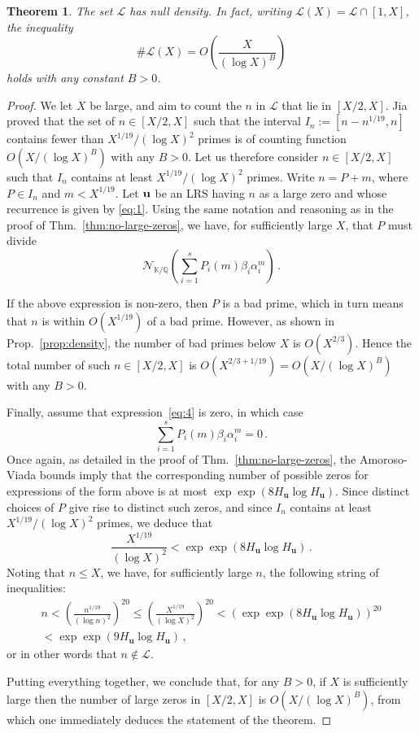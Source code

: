 \documentclass[preprint,12pt]{elsarticle}
\newtheorem{theorem}{Theorem}[section]
\begin{document}
\begin{theorem}
  \label{thm:density-0}
  The set ${\mathcal L}$ has null density.
  In fact, writing ${\mathcal L}(X)={\mathcal L} \mathop{\cap} [1,X]$, the inequality 
\[
\#{\mathcal L}(X)=O\left(\frac{X}{(\log X)^B}\right) 
\]
holds with any constant $B>0$. 
\end{theorem}   
\begin{proof}
We let $X$ be large, and aim to count the $n$ in $\mathcal{L}$ that
lie in $[X/2,X]$. Jia~\cite{Jia96} proved that the set of $n\in
[X/2,X]$ such that the interval $I_n :=[n-n^{1/19}, n]$
contains fewer than $X^{1/19}/(\log X)^2$ primes is of counting
function  $O(X/(\log X)^B)$ with any $B>0$. Let us therefore
consider $n \in [X/2,X]$ such that
$I_n$ contains at least $X^{1/19}/(\log X)^2$ primes.
Write $n=P+m$, where $P\in I_n$ and $m<X^{1/19}$. Let ${\bf u}$
be an LRS having $n$ as a large zero and whose recurrence is given by 
\eqref{eq:1}. Using the same notation and reasoning as in the proof of
Thm.~\ref{thm:no-large-zeros},
we have, for sufficiently large $X$, that $P$ must divide
\begin{equation}
\label{eq:4}
{\mathcal N}_{{\mathbb K}/{\mathbb Q}}\left(\sum_{i=1}^s
  P_i(m)\beta_i\alpha_i^m\right) \, .
\end{equation}

If the above expression is non-zero, then $P$ is a bad prime, which in
turn means that $n$ is within $O(X^{1/19})$ of a bad prime. However, as
shown in Prop.~\ref{prop:density}, the number of bad primes below $X$
is $O(X^{2/3})$. Hence the total number of such $n\in [X/2,X]$ is 
$O(X^{2/3+1/19})=O(X/(\log X)^B)$ with any $B > 0$.

Finally, assume that expression~\eqref{eq:4} is zero, in which
case
\[
\sum_{i=1}^s P_i(m)\beta_i\alpha_i^m=0 \, .
\]
Once again, as detailed in the proof of Thm.~\ref{thm:no-large-zeros},
the Amoroso-Viada bounds imply that the corresponding number of
possible zeros for expressions of the form above is at most
$\exp \exp (8 H_{\mathbf{u}} \log H_{\mathbf{u}})$. Since distinct
choices of $P$ give rise to distinct such zeros, and since
$I_n$ contains at least $X^{1/19}/(\log X)^2$ primes, we deduce that
\[ \frac{X^{1/19}}{(\log X)^2} < \exp \exp (8 H_{\mathbf{u}} \log
  H_{\mathbf{u}}) \, . \]
Noting that $n \leq X$, we have, for sufficiently large $n$, the following string of
inequalities:
\begin{multline*}
  n < \left( \frac{n^{1/19}}{(\log n)^2}\right)^{20} \leq
  \left( \frac{X^{1/19}}{(\log X)^2}\right)^{20} < 
  (\exp \exp (8 H_{\mathbf{u}} \log
  H_{\mathbf{u}}))^{20} \\ < \exp \exp (9 H_{\mathbf{u}} \log
  H_{\mathbf{u}}) \, ,
\end{multline*}  
or in other words that $n \notin \mathcal{L}$.

Putting everything together, we conclude that, for any $B > 0$, if $X$
is sufficiently large then the number of large zeros in $[X/2,X]$ is
$O(X/(\log X)^B)$, from which one immediately deduces the statement of
the theorem.
\end{proof}
\end{document}
